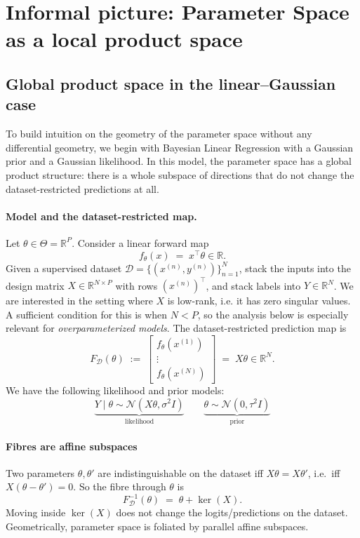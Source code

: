 \section{Informal picture: Parameter Space as a local product space} 
\label{sec:informal_local_product}

\subsection{Global product space in the linear--Gaussian case}
\label{subsec:linear_gaussian_global_product}

To build intuition on the geometry of the parameter space without any differential geometry, we begin with Bayesian Linear Regression with a Gaussian prior and a Gaussian likelihood. In this model, the parameter space has a global product structure: there is a whole subspace of directions that do not change the dataset-restricted predictions at all.

\paragraph{Model and the dataset-restricted map.}
Let $\theta\in\Theta=\mathbb{R}^P$. Consider a linear forward map
\[
  f_\theta(x) \;=\; x^\top \theta \in \mathbb{R}.
\]
Given a supervised dataset $\mathcal{D}=\{(x^{(n)},y^{(n)})\}_{n=1}^N$, stack the inputs into the design matrix
$X\in\mathbb{R}^{N\times P}$ with rows $(x^{(n)})^\top$, and stack labels into $Y\in\mathbb{R}^N$. We are interested in the setting where $X$ is low-rank, i.e. it has zero singular values. A sufficient condition for this is when $N < P$, so the analysis below is especially relevant for \emph{overparameterized models}.
The dataset-restricted prediction map is
\[
  F_{\mathcal{D}}(\theta)
  \;:=\;
  \begin{bmatrix}
    f_\theta(x^{(1)})\\ \vdots\\ f_\theta(x^{(N)})
  \end{bmatrix}
  \;=\; X\theta \in \mathbb{R}^N.
\]
We have the following likelihood and prior models:
\[
\underbrace{
Y \mid \theta \sim \mathcal{N}(X\theta,\sigma^2 I)
}_{\scriptstyle \text{likelihood}}
\qquad
\underbrace{
\theta \sim \mathcal{N}(0,\tau^2 I)
}_{\scriptstyle \text{prior}}
\]

\paragraph{Fibres are affine subspaces}
Two parameters $\theta,\theta'$ are indistinguishable on the dataset iff $X\theta=X\theta'$,
i.e.\ iff $X(\theta-\theta')=0$. So the fibre through $\theta$ is
\[
  F_{\mathcal{D}}^{-1}(\theta)
  \;=\;
  \theta + \ker(X).
\]
Moving inside $\ker(X)$ does not change the logits/predictions on the dataset.
Geometrically, parameter space is foliated by parallel affine subspaces.

